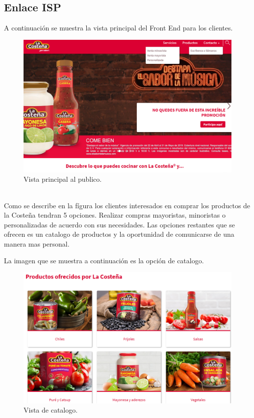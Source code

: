 \documentclass[12pt,letterpaper]{article}
\begin{document}
\subsection{Enlace ISP}
A continuación se muestra la vista principal del Front End para los clientes.
\begin{figure}[ht]
    \centering
    \includegraphics[width=1\textwidth]{imagenes/fron0.png}
    \caption{Vista principal al publico.}
\end{figure}
\\
Como se describe en la fígura los clientes interesados en comprar los productos de la Costeña 
tendran 5 opciones. Realizar compras mayoristas, minoristas o personalizadas de acuerdo con 
sus necesidades. Las opciones restantes que se ofrecen es un catalogo de productos y la oportunidad 
de comunicarse de una manera mas personal.

\newpage
La imagen que se muestra a continuación es la opción de catalogo.
\begin{figure}[ht]
    \centering
    \includegraphics[width=1\textwidth]{imagenes/fron1.png}
    \caption{Vista de catalogo.}
\end{figure}
\end{document}
